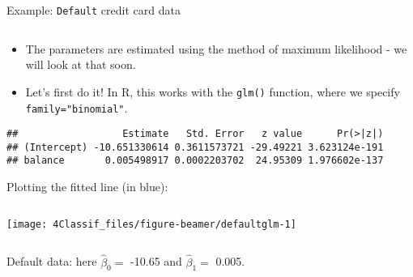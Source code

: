 \documentclass[10pt,ignorenonframetext,]{beamer}
\newenvironment{Shaded}{\begin{snugshade}}{\end{snugshade}}
\newcommand{\DataTypeTok}[1]{\textcolor[rgb]{0.13,0.29,0.53}{#1}}
\newcommand{\DecValTok}[1]{\textcolor[rgb]{0.00,0.00,0.81}{#1}}
\newcommand{\KeywordTok}[1]{\textcolor[rgb]{0.13,0.29,0.53}{\textbf{#1}}}
\newcommand{\NormalTok}[1]{#1}
\newcommand{\OperatorTok}[1]{\textcolor[rgb]{0.81,0.36,0.00}{\textbf{#1}}}
\newcommand{\StringTok}[1]{\textcolor[rgb]{0.31,0.60,0.02}{#1}}
\providecommand{\tightlist}{%
  \setlength{\itemsep}{0pt}\setlength{\parskip}{0pt}}
\begin{document}
\begin{frame}[fragile]

\begin{block}{Example: \texttt{Default} credit card data}

\(~\)

\begin{itemize}
\tightlist
\item
  The parameters are estimated using the method of maximum likelihood -
  we will look at that soon.
\end{itemize}

\vspace{2mm}

\begin{itemize}
\tightlist
\item
  Let's first do it! In R, this works with the \texttt{glm()} function,
  where we specify \texttt{family="binomial"}.
\end{itemize}

\vspace{4mm}

\scriptsize

\begin{Shaded}
\end{Shaded}

\begin{verbatim}
##                  Estimate   Std. Error   z value      Pr(>|z|)
## (Intercept) -10.651330614 0.3611573721 -29.49221 3.623124e-191
## balance       0.005498917 0.0002203702  24.95309 1.976602e-137
\end{verbatim}

\end{block}

\end{frame}

\begin{frame}

Plotting the fitted line (in blue):

\(~\)

\begin{center}\texttt{[image: 4Classif\_files/figure-beamer/defaultglm-1]} \end{center}

\(~\)

Default data: here \(\hat{\beta}_0=\) -10.65 and \(\hat{\beta}_1=\)
0.005.

\end{frame}
\end{document}
